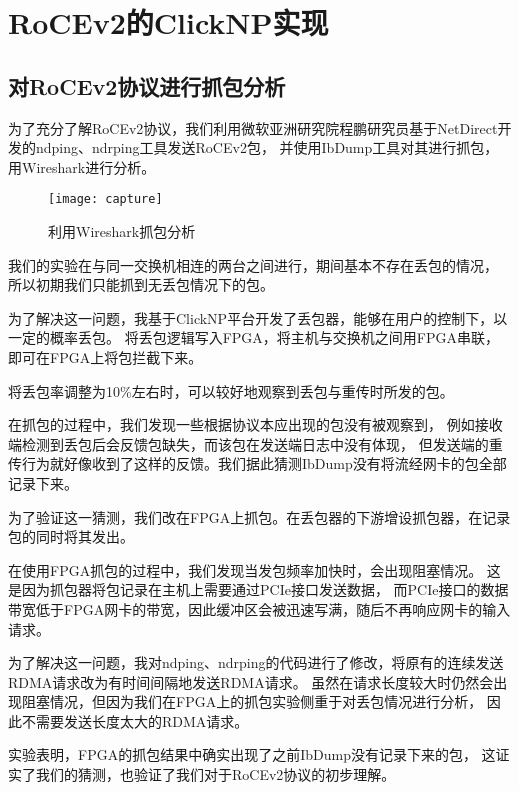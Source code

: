 \chapter{RoCEv2的ClickNP实现}
\section{对RoCEv2协议进行抓包分析}
为了充分了解RoCEv2协议，我们利用微软亚洲研究院程鹏研究员基于NetDirect开发的ndping、ndrping工具发送RoCEv2包，
并使用IbDump工具对其进行抓包，用Wireshark进行分析。
\begin{figure}[htbp]
\centering
\texttt{[image: capture]}
\caption{利用Wireshark抓包分析} \label{fig:capture}
\end{figure}

\begin{figure}[htbp]
\centering

\end{figure}

我们的实验在与同一交换机相连的两台之间进行，期间基本不存在丢包的情况，
所以初期我们只能抓到无丢包情况下的包。

为了解决这一问题，我基于ClickNP平台开发了丢包器，能够在用户的控制下，以一定的概率丢包。
将丢包逻辑写入FPGA，将主机与交换机之间用FPGA串联，即可在FPGA上将包拦截下来。

将丢包率调整为10\%左右时，可以较好地观察到丢包与重传时所发的包。

在抓包的过程中，我们发现一些根据协议本应出现的包没有被观察到，
例如接收端检测到丢包后会反馈包缺失，而该包在发送端日志中没有体现，
但发送端的重传行为就好像收到了这样的反馈。我们据此猜测IbDump没有将流经网卡的包全部记录下来。

为了验证这一猜测，我们改在FPGA上抓包。在丢包器的下游增设抓包器，在记录包的同时将其发出。

在使用FPGA抓包的过程中，我们发现当发包频率加快时，会出现阻塞情况。
这是因为抓包器将包记录在主机上需要通过PCIe接口发送数据，
而PCIe接口的数据带宽低于FPGA网卡的带宽，因此缓冲区会被迅速写满，随后不再响应网卡的输入请求。

为了解决这一问题，我对ndping、ndrping的代码进行了修改，将原有的连续发送RDMA请求改为有时间间隔地发送RDMA请求。
虽然在请求长度较大时仍然会出现阻塞情况，但因为我们在FPGA上的抓包实验侧重于对丢包情况进行分析，
因此不需要发送长度太大的RDMA请求。

实验表明，FPGA的抓包结果中确实出现了之前IbDump没有记录下来的包，
这证实了我们的猜测，也验证了我们对于RoCEv2协议的初步理解。


